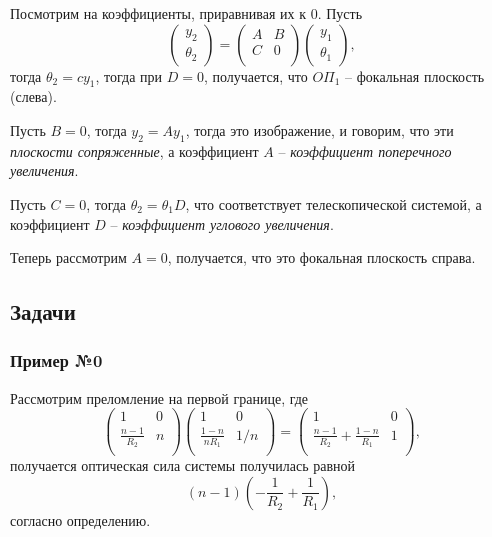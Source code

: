 Посмотрим на коэффициенты, приравнивая их к 0. Пусть 
\begin{equation*}
    \begin{pmatrix}
        y_2 \\ \theta_2
    \end{pmatrix} = 
    \begin{pmatrix}
        A & B \\
        C & 0 \\
    \end{pmatrix}
    \begin{pmatrix}
        y_1 \\ \theta_1
    \end{pmatrix},
\end{equation*}
тогда $\theta_2 = c y_1$, тогда при $D=0$,  получается, что $O\Pi_1$ -- фокальная плоскость (слева).

Пусть $B=0$, тогда $y_2 = A y_1$, тогда это изображение, и говорим, что эти \textit{плоскости сопряженные}, а коэффициент $A$ -- \textit{коэффициент поперечного увеличения}. 

Пусть $C=0$, тогда $\theta_2 = \theta_1 D$, что соответствует телескопической системой, а коэффициент $D$ -- \textit{коэффициент углового увеличения}.

Теперь рассмотрим $A = 0$, получается, что это фокальная плоскость справа. 



\subsection{Задачи}

\subsubsection*{Пример №0}

Рассмотрим преломление на первой границе, где
\begin{equation*}
    \begin{pmatrix}
        1 & 0 \\
        \frac{n-1}{R_2} & n \\
    \end{pmatrix}
    \begin{pmatrix}
        1 & 0 \\
        \frac{1-n}{n R_1} & 1/n \\
    \end{pmatrix} = 
    \begin{pmatrix}
        1 & 0 \\
        \frac{n-1}{R_2}+\frac{1-n}{R_1} & 1 \\
    \end{pmatrix},
\end{equation*}
получается оптическая сила системы получилась равной
\begin{equation*}
    (n-1) \left(
        -\frac{1}{R_2} + \frac{1}{R_1}
    \right),
\end{equation*}
согласно определению.

